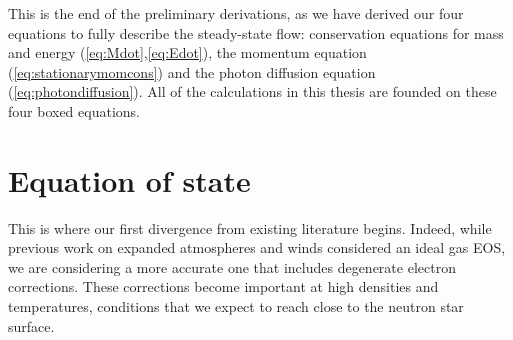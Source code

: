 \documentclass[../main.tex]{subfiles}
\begin{document}
This is the end of the preliminary derivations, as we have derived our four equations to fully describe the steady-state flow: conservation equations for mass and energy (\ref{eq:Mdot},\ref{eq:Edot}), the momentum equation (\ref{eq:stationarymomcons}) and the photon diffusion equation (\ref{eq:photondiffusion}). All of the calculations in this thesis are founded on these four boxed equations.

\section{Equation of state}\label{sec:eos}
This is where our first divergence from existing literature begins. Indeed, while previous work on expanded atmospheres and winds considered an ideal gas EOS, we are considering a more accurate one that includes degenerate electron corrections.  These corrections become important at high densities and temperatures, conditions that we expect to reach close to the neutron star surface. 
\end{document}
